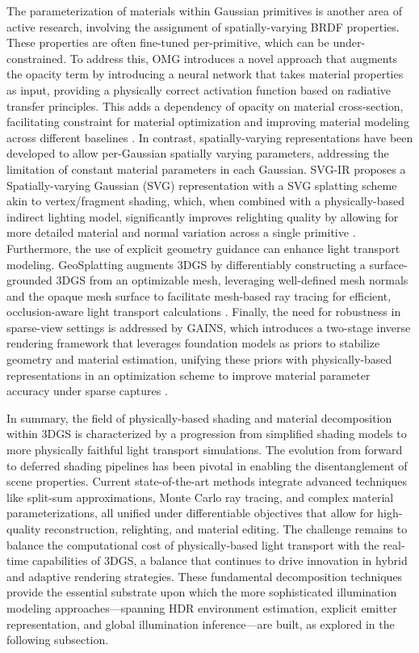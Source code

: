 \documentclass[11pt]{article}
\begin{document}
The parameterization of materials within Gaussian primitives is another area of active research, involving the assignment of spatially-varying BRDF properties. These properties are often fine-tuned per-primitive, which can be under-constrained. To address this, OMG introduces a novel approach that augments the opacity term by introducing a neural network that takes material properties as input, providing a physically correct activation function based on radiative transfer principles. This adds a dependency of opacity on material cross-section, facilitating constraint for material optimization and improving material modeling across different baselines \cite{ref576}. In contrast, spatially-varying representations have been developed to allow per-Gaussian spatially varying parameters, addressing the limitation of constant material parameters in each Gaussian. SVG-IR proposes a Spatially-varying Gaussian (SVG) representation with a SVG splatting scheme akin to vertex/fragment shading, which, when combined with a physically-based indirect lighting model, significantly improves relighting quality by allowing for more detailed material and normal variation across a single primitive \cite{ref577}. Furthermore, the use of explicit geometry guidance can enhance light transport modeling. GeoSplatting augments 3DGS by differentiably constructing a surface-grounded 3DGS from an optimizable mesh, leveraging well-defined mesh normals and the opaque mesh surface to facilitate mesh-based ray tracing for efficient, occlusion-aware light transport calculations \cite{ref578}. Finally, the need for robustness in sparse-view settings is addressed by GAINS, which introduces a two-stage inverse rendering framework that leverages foundation models as priors to stabilize geometry and material estimation, unifying these priors with physically-based representations in an optimization scheme to improve material parameter accuracy under sparse captures \cite{ref579}.

In summary, the field of physically-based shading and material decomposition within 3DGS is characterized by a progression from simplified shading models to more physically faithful light transport simulations. The evolution from forward to deferred shading pipelines has been pivotal in enabling the disentanglement of scene properties. Current state-of-the-art methods integrate advanced techniques like split-sum approximations, Monte Carlo ray tracing, and complex material parameterizations, all unified under differentiable objectives that allow for high-quality reconstruction, relighting, and material editing. The challenge remains to balance the computational cost of physically-based light transport with the real-time capabilities of 3DGS, a balance that continues to drive innovation in hybrid and adaptive rendering strategies. These fundamental decomposition techniques provide the essential substrate upon which the more sophisticated illumination modeling approaches---spanning HDR environment estimation, explicit emitter representation, and global illumination inference---are built, as explored in the following subsection.
\end{document}
